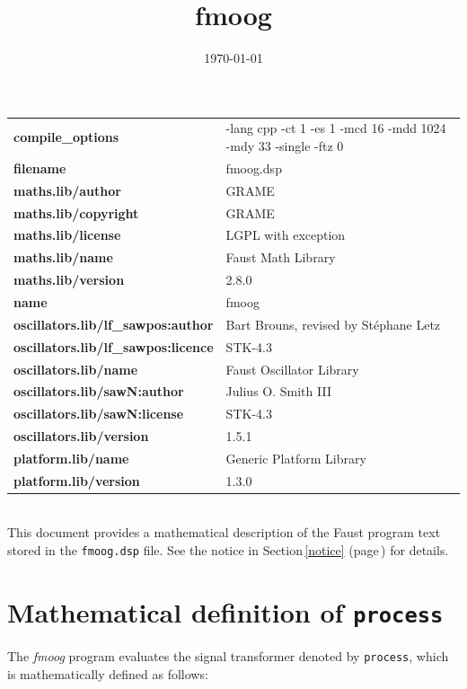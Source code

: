 \documentclass{article}
\newcommand{\faustfilename}{fmoog.dsp}
\newcommand{\faustprogname}{fmoog}
\begin{document}
\title{fmoog} \date{\today} \maketitle \begin{tabular}{ll}  \hline  \textbf{compile_options} & -lang cpp -ct 1 -es 1 -mcd 16 -mdd 1024 -mdy 33 -single -ftz 0 \\  \textbf{filename} & fmoog.dsp \\  \textbf{maths.lib/author} & GRAME \\  \textbf{maths.lib/copyright} & GRAME \\  \textbf{maths.lib/license} & LGPL with exception \\  \textbf{maths.lib/name} & Faust Math Library \\  \textbf{maths.lib/version} & 2.8.0 \\  \textbf{name} & fmoog \\  \textbf{oscillators.lib/lf_sawpos:author} & Bart Brouns, revised by Stéphane Letz \\  \textbf{oscillators.lib/lf_sawpos:licence} & STK-4.3 \\  \textbf{oscillators.lib/name} & Faust Oscillator Library \\  \textbf{oscillators.lib/sawN:author} & Julius O. Smith III \\  \textbf{oscillators.lib/sawN:license} & STK-4.3 \\  \textbf{oscillators.lib/version} & 1.5.1 \\  \textbf{platform.lib/name} & Generic Platform Library \\  \textbf{platform.lib/version} & 1.3.0 \\  \hline \end{tabular} \bigskip  \bigskip \\ This document provides a mathematical description of the Faust program text stored in the \texttt{\faustfilename} file. See the notice in Section\,\ref{notice} (page\,\pageref{notice}) for details. \\  \section{Mathematical definition of \texttt{process}} \label{equation}  The \emph{\faustprogname} program evaluates the signal transformer denoted by \texttt{process}, which is mathematically defined as follows: 
\end{document}
